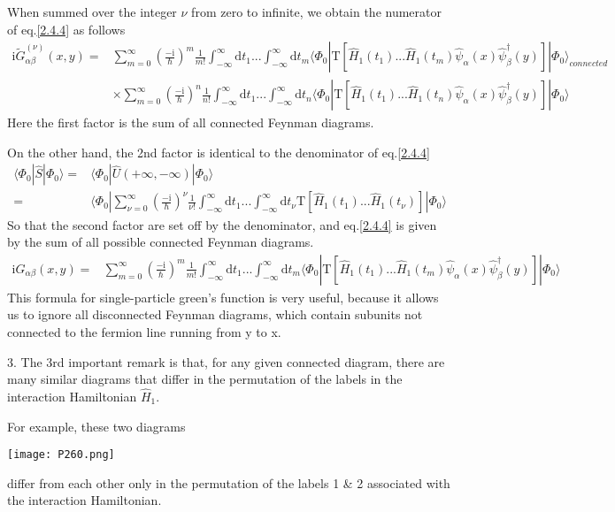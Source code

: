 When summed over the integer $\nu$ from zero to infinite, we obtain the numerator of eq.\ref{2.4.4} as follows
\begin{align}
\mathrm{i}\tilde{G}_{\alpha\beta}^{(\nu)}(x,y)=& \sum_{m=0}^{\infty}(\frac{-\mathrm{i}}{\hbar})^{m}\frac{1}{m!}\int_{-\infty}^{\infty}\mathrm{d}t_1...\int_{-\infty}^{\infty}\mathrm{d}t_{m}\langle\Phi_0|\mathrm{T}[\hat H_1(t_1)...\hat H_1(t_{m})\hat \psi_{\alpha}(x)\hat \psi^{\dagger}_{\beta}(y)]|\Phi_0\rangle_{connected} \nonumber \\
&\times\sum_{m=0}^{\infty}(\frac{-\mathrm{i}}{\hbar})^{n}\frac{1}{n!}\int_{-\infty}^{\infty}\mathrm{d}t_1...\int_{-\infty}^{\infty}\mathrm{d}t_{n}\langle\Phi_0|\mathrm{T}[\hat H_1(t_1)...\hat H_1(t_{n})\hat \psi_{\alpha}(x)\hat \psi^{\dagger}_{\beta}(y)]|\Phi_0\rangle\nonumber 
\end{align}
Here the first factor is the sum of all connected Feynman diagrams.

On the other hand, the 2nd factor is identical to the denominator of eq.\ref{2.4.4}
\begin{align}
\langle\Phi_0|\hat{S}|\Phi_0\rangle=&\langle\Phi_0|\hat{U}(+\infty,-\infty)|\Phi_0\rangle \nonumber \\
=&\langle\Phi_0|\sum_{\nu=0}^{\infty}(\frac{-\mathrm{i}}{\hbar})^{\nu}\frac{1}{\nu!}\int_{-\infty}^{\infty}\mathrm{d}t_1...\int_{-\infty}^{\infty}\mathrm{d}t_{\nu}\mathrm{T}[\hat H_1(t_1)...\hat H_1(t_{\nu})]|\Phi_0\rangle\nonumber 
\end{align}
So that the second factor are set off by the denominator, and eq.\ref{2.4.4} is given by the sum of all possible connected Feynman diagrams.
\begin{align} \label{2.5.3}
\mathrm{i}G_{\alpha\beta}(x,y)=& \sum_{m=0}^{\infty}(\frac{-\mathrm{i}}{\hbar})^{m}\frac{1}{m!}\int_{-\infty}^{\infty}\mathrm{d}t_1...\int_{-\infty}^{\infty}\mathrm{d}t_{m}\langle\Phi_0|\mathrm{T}[\hat H_1(t_1)...\hat H_1(t_{m})\hat \psi_{\alpha}(x)\hat \psi^{\dagger}_{\beta}(y)]|\Phi_0\rangle
\end{align}
This formula for single-particle green's function is very useful, because it allows us to ignore all disconnected Feynman diagrams, which contain subunits not connected to the fermion line running from y to x.

3. The 3rd important remark is that, for any given connected diagram, there are many similar diagrams that differ in the permutation of the labels in the interaction Hamiltonian $\hat H_1$.

For example, these two diagrams 
\begin{center}
\texttt{[image: P260.png]}
\end{center}
differ from each other only in the permutation of the labels 1 \& 2 associated with the interaction Hamiltonian.

